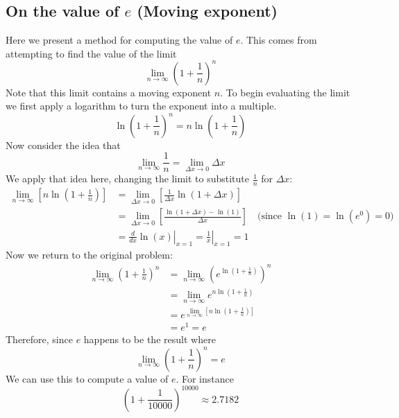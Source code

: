 \documentclass{report}
\begin{document}
\subsection{On the value of $e$ (Moving exponent)} %
Here we present a method for computing the value of $e$. This comes from attempting to
find the value of the limit
\begin{equation*}
\lim_{n\to\infty}\left(1+\frac{1}{n}\right)^n
\end{equation*}
Note that this limit contains a moving exponent $n$. To begin evaluating the limit we
first apply a logarithm to turn the exponent into a multiple.
\begin{equation*}
\ln\left(1+\frac{1}{n}\right)^n=n\ln\left(1+\frac{1}{n}\right)
\end{equation*}
Now consider the idea that
\begin{equation*}
\lim_{n\to\infty}\frac{1}{n}=\lim_{\Delta x\to0}\Delta x
\end{equation*}
We apply that idea here, changing the limit to substitute $\frac{1}{n}$ for $\Delta x$:
\begin{align*}
\lim_{n\to\infty}\left[n\ln\left(1+\frac{1}{n}\right)\right]&=
\lim_{\Delta x\to0}\left[\frac{1}{\Delta x}\ln\left(1+\Delta x\right)\right]\\
&=\lim_{\Delta x\to0}\left[\frac{\ln(1+\Delta x)-\ln(1)}{\Delta x}\right]\quad
\text{(since $\ln(1)=\ln(e^0)=0$)}\\
&=\left.\frac{d}{dx}\ln(x)\right|_{x=1}
=\left.\frac{1}{x}\right|_{x=1}=1
\end{align*}
Now we return to the original problem:
\begin{align*}
\lim_{n\to\infty}\left(1+\frac{1}{n}\right)^n
&=\lim_{n\to\infty}\left(e^{\ln(1+\frac{1}{n})}\right)^n\\
&=\lim_{n\to\infty}e^{n\ln(1+\frac{1}{n})}\\
&=e^{\lim_{n\to\infty}\left[n\ln(1+\frac{1}{n})\right]}\\
&=e^1=e
\end{align*}
Therefore, since $e$ happens to be the result where
\begin{equation*}
\lim_{n\to\infty}\left(1+\frac{1}{n}\right)^n=e
\end{equation*}
We can use this to compute a value of $e$. For instance
\begin{equation*}
\left(1+\frac{1}{10000}\right)^{10000}\approx 2.7182
\end{equation*}
\newpage
\end{document}
